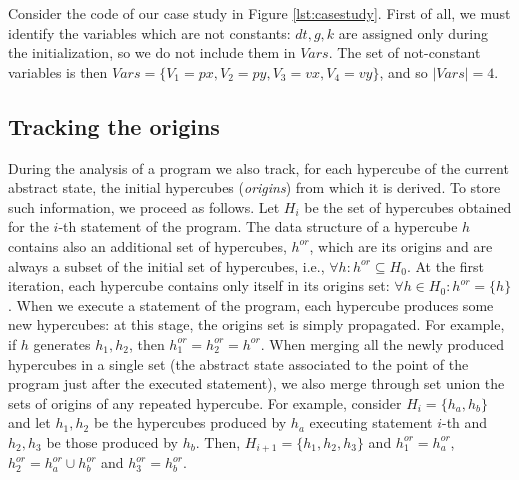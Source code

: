 Consider the code of our case study in Figure \ref{lst:casestudy}. First of all, we must identify the variables which are not constants: $dt,g,k$ are assigned only during the initialization, so we do not include them in $Vars$. The set of not-constant variables is then $Vars = \{ V_1 = px, V_2 = py, V_3 = vx, V_4 = vy \}$, and so $|Vars| = 4$.

\vspace{-10pt}
\subsection{Tracking the origins}\label{sec:origins}
\vspace{-5pt}
During the analysis of a program we also track, for each hypercube of the current abstract state, the initial hypercubes (\textit{origins}) from which it is derived. To store such information, we proceed as follows. Let $H_i$ be the set of hypercubes obtained for the $i$-th statement of the program. The data structure of a hypercube $h$ contains also an additional set of hypercubes, $h^{or}$, which are its origins and are always a subset of the initial set of hypercubes, i.e., $\forall h : h^{or} \subseteq H_0$. At the first iteration, each hypercube contains only itself in its origins set: $\forall h \in H_0 : h^{or} = \{ h \}$. When we execute a statement of the program, each hypercube produces some new hypercubes: at this stage, the origins set is simply propagated. For example, if $h$ generates $h_1,h_2$, then $h_1^{or} = h_2^{or} = h^{or}$. When merging all the newly produced hypercubes in a single set (the abstract state associated to the point of the program just after the executed statement), we also merge through set union the sets of origins of any repeated hypercube. For example, consider $H_i = \{ h_a, h_b \}$ and let $h_1,h_2$ be the hypercubes produced by $h_a$ executing statement $i$-th and $h_2,h_3$ be those produced by $h_b$. Then, $H_{i+1} = \{ h_1,h_2,h_3\}$ and $h_1^{or} = h_a^{or}$, $h_2^{or}= h_a^{or} \cup h_b^{or}$ and $h_3^{or} = h_b^{or}$.

\vspace{-10pt}
